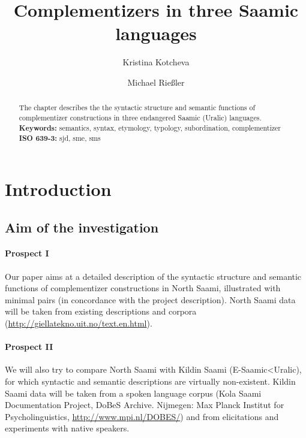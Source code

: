 \documentclass[a4,12pt]{scrartcl}
\title{Complementizers in three Saamic languages}
\author[1]{Kristina Kotcheva}
\author[2]{Michael Rießler}
\affil[1]{Department of Linguistics, University of Konstanz}
\affil[2]{Scandinavian Department, University of Freiburg}
\begin{document}

\tableofcontents 
\newpage

\maketitle

\begin{abstract}
The chapter describes the the syntactic structure and semantic functions of complementizer constructions in three endangered Saamic (Uralic) languages.\\%

{\bf Keywords:} semantics, syntax, etymology, typology, subordination, complementizer\\

{\bf ISO 639-3:} sjd, sme, sms 
\end{abstract}


\section{Introduction}\label{intro}

\subsection{Aim of the investigation}

\paragraph{Prospect I}  Our paper aims at a detailed description of the syntactic structure and semantic functions of complementizer constructions in North Saami, illustrated with minimal pairs (in concordance with the project description). North Saami data will be taken from existing descriptions \cite[e.g.]{nickel1994, sammallahti1998b, nielsen1979-1} and corpora (\url{http://giellatekno.uit.no/text.en.html}).  %

\paragraph{Prospect II} We will also try to compare North Saami with Kildin Saami (E-Saamic<Uralic), for which syntactic and semantic descriptions are virtually non-existent. Kildin Saami data will be taken from a spoken language corpus (Kola Saami Documentation Project, DoBeS Archive. Nijmegen: Max Planck 
Institut for Psycholinguistics, \url{http://www.mpi.nl/DOBES/}) and from elicitations and experiments with native speakers.
\end{document}
